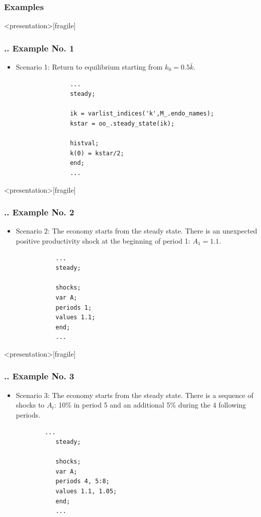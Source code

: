 \documentclass[11pt,aspectratio=169]{beamer}
\begin{document}
\subsubsection{Examples}
\begin{frame}<presentation>[fragile]
	\frametitle{{\thesection.\thesubsection.\thesubsubsection} Example No. 1}
	\begin{itemize}
		\item Scenario 1: Return to equilibrium starting from $k_0=0.5\bar{k}$.
			\begin{verbatim}
			   ...
			   steady;
			   
			   ik = varlist_indices('k',M_.endo_names);
			   kstar = oo_.steady_state(ik);
			   
			   histval;
			   k(0) = kstar/2;
			   end;
			   ...
			\end{verbatim}
	\end{itemize}
\end{frame}
\begin{frame}<presentation>[fragile]
	\frametitle{{\thesection.\thesubsection.\thesubsubsection} Example No. 2}
	\begin{itemize}
		\item Scenario 2: The economy starts from the steady state. There is an unexpected positive productivity shock at the beginning of period 1: $A_1 = 1.1$.
		\begin{verbatim}
		   ...
		   steady;
		
		   shocks;
		   var A;
		   periods 1;
		   values 1.1;
		   end;
		   ...
		\end{verbatim}
	\end{itemize}
\end{frame}
\begin{frame}<presentation>[fragile]
	\frametitle{{\thesection.\thesubsection.\thesubsubsection} Example No. 3}
	\begin{itemize}
		\item Scenario 3: The economy starts from the steady state. There is a sequence of shocks to $A_t$: 10\% in period 5 and an additional 5\% during the 4 following periods.
		\begin{verbatim}
	  	...
		   steady;
		
		   shocks;
		   var A;
		   periods 4, 5:8;
		   values 1.1, 1.05;
		   end;
		   ...
		\end{verbatim}
	\end{itemize}
\end{frame}
\end{document}
